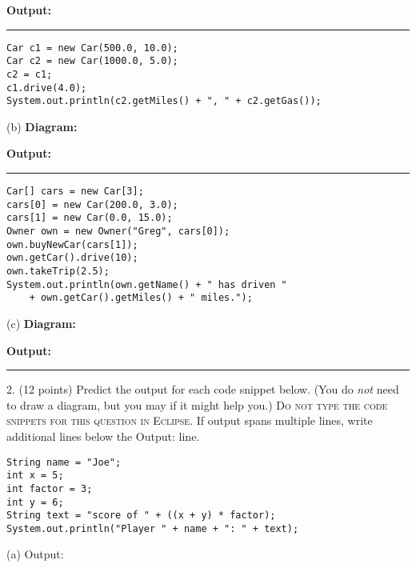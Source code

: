 \documentclass[12pt,twoside]{article}
\newcommand{\fillInBlank}[1][0.5in]{\underline{\hspace{#1}}}
\begin{document}
\vfill
\textbf{Output:}
\hrule
\begin{minipage}[t]{0.68\linewidth}
\begin{lstlisting}
Car c1 = new Car(500.0, 10.0);
Car c2 = new Car(1000.0, 5.0);
c2 = c1;
c1.drive(4.0);
System.out.println(c2.getMiles() + ", " + c2.getGas());
\end{lstlisting}
\end{minipage}
\hspace{3.25in}
\begin{minipage}[t]{0.3\linewidth}
\vspace*{1 mm} 
\end{minipage}
(b) \textbf{Diagram:}

\vfill
\textbf{Output:}
\hrule
\clearpage
\begin{minipage}[t]{0.68\linewidth}
\begin{lstlisting}
Car[] cars = new Car[3];
cars[0] = new Car(200.0, 3.0);
cars[1] = new Car(0.0, 15.0);
Owner own = new Owner("Greg", cars[0]);
own.buyNewCar(cars[1]);
own.getCar().drive(10);
own.takeTrip(2.5);
System.out.println(own.getName() + " has driven " 
	+ own.getCar().getMiles() + " miles.");
\end{lstlisting}
\end{minipage}
\hspace{3.25in}
\begin{minipage}[t]{0.3\linewidth}
\vspace*{1 mm} 
\end{minipage}
(c) \textbf{Diagram:}


\vfill
\textbf{Output:}
\hrule

\clearpage

2. (12 points) Predict the output for each code snippet below. (You do \emph{not} need to draw a diagram, but you may if it might help you.) \textsc{Do not type the code snippets for this question in Eclipse}. If output spans multiple lines, write additional lines below the Output: line.
\vspace{0.25in}

\hfill
\begin{minipage}{0.60\linewidth}
\begin{lstlisting}
String name = "Joe";
int x = 5;
int factor = 3;
int y = 6;
String text = "score of " + ((x + y) * factor);
System.out.println("Player " + name + ": " + text);
\end{lstlisting}
\end{minipage}
\hspace{0.25in}
(a) Output: \fillInBlank[1in]
\end{document}
